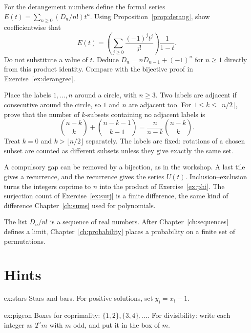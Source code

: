 \begin{exercise}[$\star\star$]\label{ex:count-derang-gf}
For the derangement numbers define the formal series $E(t)=\sum_{n\ge0}(D_n/n!)t^n$. Using Proposition~\ref{prop:derang}, show coefficientwise that
\[
E(t)=\left(\sum_{j\ge0}\frac{(-1)^jt^j}{j!}\right)\frac1{1-t}.
\]
Do not substitute a value of $t$. Deduce $D_n=nD_{n-1}+(-1)^n$ for $n\ge1$ directly from this product identity. Compare with the bijective proof in Exercise~\ref{ex:derangrec}.
\end{exercise}

\begin{exercise}[$\star\star\star$]\label{ex:count-circle}
Place the labels $1,\dots,n$ around a circle, with $n\ge3$. Two labels are adjacent if consecutive around the circle, so $1$ and $n$ are adjacent too. For $1\le k\le\lfloor n/2\rfloor$, prove that the number of $k$-subsets containing no adjacent labels is
\[
\binom{n-k}{k}+\binom{n-k-1}{k-1}
=\frac{n}{n-k}\binom{n-k}{k}.
\]
Treat $k=0$ and $k>\lfloor n/2\rfloor$ separately. The labels are fixed: rotations of a chosen subset are counted as different subsets unless they give exactly the same set.
\end{exercise}

\begin{beauty}
A compulsory gap can be removed by a bijection, as in the workshop. A last tile gives a recurrence, and the recurrence gives the series $U(t)$. Inclusion--exclusion turns the integers coprime to $n$ into the product of Exercise~\ref{ex:phi}. The surjection count of Exercise~\ref{ex:surj} is a finite difference, the same kind of difference Chapter~\ref{ch:sums} used for polynomials.

The list $D_n/n!$ is a sequence of real numbers. After Chapter~\ref{ch:sequences} defines a limit, Chapter~\ref{ch:probability} places a probability on a finite set of permutations.
\end{beauty}

\section{Hints}
\begin{hint}{ex:stars}
Stars and bars. For positive solutions, set $y_i=x_i-1$.
\end{hint}

\begin{hint}{ex:pigeon}
Boxes for coprimality: $\{1,2\},\{3,4\},\dots$. For divisibility: write each integer as $2^a m$ with $m$ odd, and put it in the box of $m$.
\end{hint}

